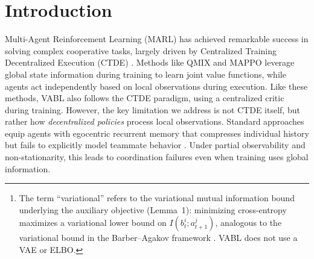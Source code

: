 \documentclass{article}
\theoremstyle{plain}
\theoremstyle{definition}
\theoremstyle{remark}
\begin{document}
\begin{abstract}
Effective multi-agent coordination under partial observability requires reasoning about the hidden intent of teammates, yet standard decentralized POMDP (Dec-POMDP) approaches rely on egocentric recurrent memory or costly explicit communication channels. We propose \textbf{VABL} (Variational Attention-based Belief Learning), a framework for implicit coordination via learned latent belief representations that eliminates the need for inter-agent communication.\footnote{The term ``variational'' refers to the variational mutual information bound underlying the auxiliary objective (Lemma~1): minimizing cross-entropy maximizes a variational lower bound on $I(b_t^i; a_{t+1}^j)$, analogous to the variational bound in the Barber--Agakov framework \cite{barber2003algorithm}. VABL does not use a VAE or ELBO.} Each agent maintains a compact belief state updated through multi-head attention over \emph{observable} teammate actions, enabling permutation-invariant, variable-size social inference. To ensure beliefs encode coordination-relevant information, we incorporate an auxiliary teammate-action prediction objective grounded in a variational mutual information bound. Across three cooperative environments---Simple Coordination (3 agents), Overcooked Asymmetric Advantages, and Overcooked Cramped Room---VABL consistently outperforms MAPPO and QMIX. On Overcooked, VABL achieves $3.3\times$ higher final reward than MAPPO with $2\times$ better stability (38\% vs.\ 76\% performance collapse), and $12\times$ lower cross-seed variance on Simple Coordination. Ablations reveal that attention is the critical component: removing it reduces peak performance by 24\%.
\end{abstract}

\section{Introduction}

Multi-Agent Reinforcement Learning (MARL) has achieved remarkable success in solving complex cooperative tasks, largely driven by Centralized Training Decentralized Execution (CTDE) \cite{lowe2017multi}. Methods like QMIX \cite{rashid2020monotonic} and MAPPO \cite{yu2022surprising} leverage global state information during training to learn joint value functions, while agents act independently based on local observations during execution. Like these methods, VABL also follows the CTDE paradigm, using a centralized critic during training. However, the key limitation we address is not CTDE itself, but rather how \emph{decentralized policies} process local observations. Standard approaches equip agents with egocentric recurrent memory that compresses individual history but fails to explicitly model teammate behavior \cite{hu2025adaptability, amato2024introduction}. Under partial observability and non-stationarity, this leads to coordination failures even when training uses global information.
\end{document}

